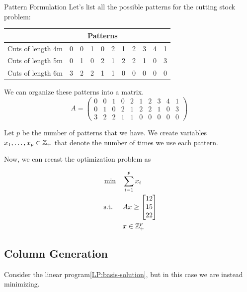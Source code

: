\begin{example}{Pattern Formulation}{}
Let's list all the possible patterns for the cutting stock problem:

\begin{center}
\begin{tabular}{l|c|c|c|c|c|c|c|c|c|c}
& \multicolumn{7}{c}{Patterns}\\
\hline
Cuts of length 4m &0 &0 &1 &0 &2 &1 &2 &3 &4 & 1\\
 Cuts of length 5m   &    0 &1 &0 &2 &1 &2& 2& 1 &0&3 \\
 Cuts of length 6m   &    3& 2 &2 &1 &1 &0& 0& 0 &0 &0\\
 \hline
\end{tabular}
\par{}\label{tab:integerProgrammingExponentialFormulations-tab01}%

\end{center}

We can organize these patterns into a matrix.
\begin{equation}
A = 
\begin{pmatrix}
0 &0 &1 &0 &2 &1 &2 &3 &4 & 1\\
        0 &1 &0 &2 &1 &2& 2& 1 &0&3 \\
        3& 2 &2 &1 &1 &0& 0& 0 &0 &0
\end{pmatrix}
 \end{equation}
 
 Let $p$ be the number of patterns that we have.  We  create variables $x_1, \dots, x_p \in \mathbb{Z}_+$ that denote the number of times we use each pattern.

Now, we can recast the optimization problem as

\begin{align*}
\min \quad & \sum_{i=1}^p x_i \\
\mbox{ s.t. } \quad  & Ax \geq \begin{bmatrix} 12 \\ 15 \\ 22\end{bmatrix}\\
& x \in \mathbb{Z}^p_+
\end{align*}
 
\end{example}

\subsection{Column Generation}
Consider the linear program\eqref{LP:basis-solution}, but in this case we are instead minimizing.  


